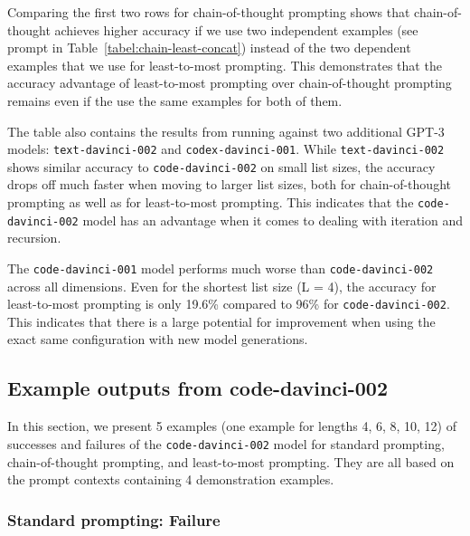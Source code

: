 Comparing the first two rows for chain-of-thought prompting shows that chain-of-thought achieves higher accuracy if we use two independent examples (see prompt in Table~\ref{tabel:chain-least-concat}) instead of the two dependent examples that we use for least-to-most prompting. This demonstrates that the accuracy advantage of least-to-most prompting over chain-of-thought prompting remains even if the use the same examples for both of them.

The table also contains the results from running against two additional GPT-3 models: \texttt{text-davinci-002} and \texttt{codex-davinci-001}. While \texttt{text-davinci-002} shows similar accuracy to \texttt{code-davinci-002} on small list sizes, the accuracy drops off much faster when moving to larger list sizes, both for chain-of-thought prompting as well as for least-to-most prompting. This indicates that the \texttt{code-davinci-002} model has an advantage when it comes to dealing with iteration and recursion.

The \texttt{code-davinci-001} model performs much worse than \texttt{code-davinci-002} across all dimensions. Even for the shortest list size (L = 4), the accuracy for least-to-most prompting is only 19.6\% compared to 96\% for \texttt{code-davinci-002}. This indicates that there is a large potential for improvement when using the exact same configuration with new model generations.





\subsection{Example outputs from code-davinci-002}
In this section, we present 5 examples (one example for lengths 4, 6, 8, 10, 12) of successes and failures of the \texttt{code-davinci-002} model for standard prompting, chain-of-thought prompting, and least-to-most prompting. They are all based on the prompt contexts containing 4 demonstration examples.

\subsubsection{Standard prompting: Failure}

